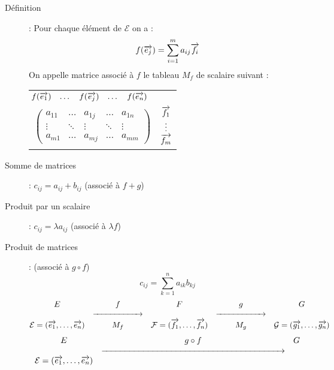 \begin{description}
\item[Définition] : Pour chaque élément de $\mathcal E$ on a :
    \[ f(\overrightarrow{e_j})=\sum_{i=1}^ma_{ij}\overrightarrow{f_i} \]
    On appelle matrice associé à $f$ le tableau $M_f$ de scalaire suivant :
    \begin{center}
        \begin{tabular}[h!]{cc}
            $\makebox[-0.25cm]{}
            \begin{matrix}
                f(\vect{e_1}) & \dots & f(\vect{e_j}) & \dots & f(\vect{e_n})
            \end{matrix}$ \\
            $\left(\begin{matrix}
                a_{11} & \dots & a_{1j} & \dots & a_{1n} \\
                \vdots & \ddots & \vdots & \ddots & \vdots \\
                a_{m1} & \dots & a_{mj} & \dots & a_{mm}
            \end{matrix}\right)$ &
            $\begin{matrix}\overrightarrow{f_1}\\\vdots\\\overrightarrow{f_m}\end{matrix}$
        \end{tabular}
    \end{center}
\item[Somme de matrices] : $c_{ij}=a_{ij}+b_{ij}$ (associé à $f+g$)
\item[Produit par un scalaire] : $c_{ij}=\lambda a_{ij}$ (associé à $\lambda f$)
\item[Produit de matrices] : (associé à $g\circ f$)
    \[ c_{ij}=\sum_{k=1}^na_{ik}b_{kj} \]
    \[\begin{matrix}
        E & f & F & g & G\\
        & \xrightarrow{\makebox[2cm]{}} & & \xrightarrow{\makebox[2cm]{}} &\\
        \mathcal{E}=(\vect{e_1},\dots,\vect{e_n}) &
        M_f &
        \mathcal{F}=(\vect{f_1},\dots,\vect{f_n}) &
        M_g &
        \mathcal{G}=(\vect{g_1},\dots,\vect{g_n})\\
    \end{matrix}\]
    \[\begin{matrix}
        E & g\circ f & G\\
        & \xrightarrow{\makebox[7.5cm]{}} & \\
        \mathcal{E}=(\vect{e_1},\dots,\vect{e_n}) &

\end{matrix}\]
\end{description}
